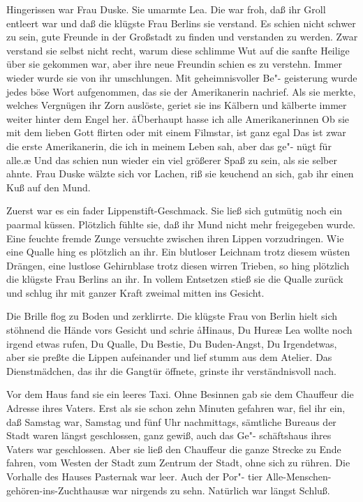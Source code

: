 Hingerissen war Frau Duske. Sie umarmte Lea. Die war
froh, daß ihr Groll entleert war und daß die klügste Frau
Berlins sie verstand. Es schien nicht schwer zu sein, gute
Freunde in der Großstadt zu finden und verstanden zu
werden. Zwar verstand sie selbst nicht recht, warum diese
schlimme Wut auf die sanfte Heilige über sie gekommen war,
aber ihre neue Freundin schien es zu verstehn. Immer wieder
wurde sie von ihr umschlungen. Mit geheimnisvoller Be"-%
geisterung wurde jedes böse Wort aufgenommen, das sie der
Amerikanerin nachrief. Als sie merkte, welches Vergnügen
ihr Zorn auslöste, geriet sie ins Kälbern und kälberte immer
weiter hinter dem Engel her. \aa{}Überhaupt hasse ich alle
Amerikanerinnen\ausr{} Ob sie mit dem lieben Gott flirten oder
mit einem Filmstar, ist ganz egal\ausr{} Das ist zwar die erste
Amerikanerin, die ich in meinem Leben sah, aber das ge"-%
nügt für alle.\ae{} Und das schien nun wieder ein viel größerer
Spaß zu sein, als sie selber ahnte. Frau Duske wälzte sich vor
Lachen, riß sie keuchend an sich, gab ihr einen Kuß auf den
Mund.

Zuerst war es ein fader Lippenstift-Geschmack. Sie ließ sich
gutmütig noch ein paarmal küssen. Plötzlich fühlte sie, daß ihr
Mund nicht mehr freigegeben wurde. Eine feuchte fremde
Zunge versuchte zwischen ihren Lippen vorzudringen. Wie eine
Qualle hing es plötzlich an ihr. Ein blutloser Leichnam trotz
diesem wüsten Drängen, eine lustlose Gehirnblase trotz diesen
wirren Trieben, so hing plötzlich die klügste Frau Berlins an
ihr. In vollem Entsetzen stieß sie die Qualle zurück und schlug
ihr mit ganzer Kraft zweimal mitten ins Gesicht.

Die Brille flog zu Boden und zerklirrte. Die klügste Frau von
Berlin hielt sich stöhnend die Hände vors Gesicht und schrie\dopp{}
\aa{}Hinaus, Du Hure\ausr{}\ae{} Lea wollte noch irgend etwas rufen, Du
Qualle, Du Bestie, Du Buden-Angst, Du Irgendetwas, aber
sie preßte die Lippen aufeinander und lief stumm aus dem
Atelier. Das Dienstmädchen, das ihr die Gangtür öffnete,
grinste ihr verständnisvoll nach.

Vor dem Haus fand sie ein leeres Taxi. Ohne Besinnen gab
sie dem Chauffeur die Adresse ihres Vaters. Erst als sie schon
zehn Minuten gefahren war, fiel ihr ein, daß Samstag war,
Samstag und fünf Uhr nachmittags, sämtliche Bureaus der
Stadt waren längst geschlossen, ganz gewiß, auch das Ge"-%
schäftshaus ihres Vaters war geschlossen. Aber sie ließ den
Chauffeur die ganze Strecke zu Ende fahren, vom Westen der
Stadt zum Zentrum der Stadt, ohne sich zu rühren.
\abstand{}
Die Vorhalle des Hauses Pasternak war leer. Auch der Por"-%
tier \aanah{}Alle-Menschen-gehören-ins-Zuchthaus\ae{} war nirgends
zu sehn. Natürlich war längst Schluß.

